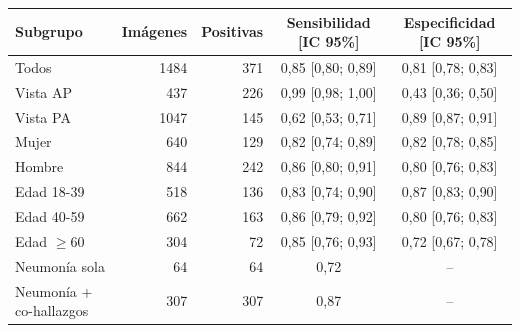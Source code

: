 \begin{tabular}{lrrcc}
\toprule
Subgrupo & Imágenes & Positivas & Sensibilidad [IC 95\%] & Especificidad [IC 95\%] \\
\midrule
Todos & 1484 & 371 & 0{,}85 [0{,}80; 0{,}89] & 0{,}81 [0{,}78; 0{,}83] \\
Vista AP & 437 & 226 & 0{,}99 [0{,}98; 1{,}00] & 0{,}43 [0{,}36; 0{,}50] \\
Vista PA & 1047 & 145 & 0{,}62 [0{,}53; 0{,}71] & 0{,}89 [0{,}87; 0{,}91] \\
Mujer & 640 & 129 & 0{,}82 [0{,}74; 0{,}89] & 0{,}82 [0{,}78; 0{,}85] \\
Hombre & 844 & 242 & 0{,}86 [0{,}80; 0{,}91] & 0{,}80 [0{,}76; 0{,}83] \\
Edad 18-39 & 518 & 136 & 0{,}83 [0{,}74; 0{,}90] & 0{,}87 [0{,}83; 0{,}90] \\
Edad 40-59 & 662 & 163 & 0{,}86 [0{,}79; 0{,}92] & 0{,}80 [0{,}76; 0{,}83] \\
Edad $\geq$60 & 304 & 72 & 0{,}85 [0{,}76; 0{,}93] & 0{,}72 [0{,}67; 0{,}78] \\
Neumonía sola & 64 & 64 & 0{,}72 & -- \\
Neumonía + co-hallazgos & 307 & 307 & 0{,}87 & -- \\
\bottomrule
\end{tabular}
